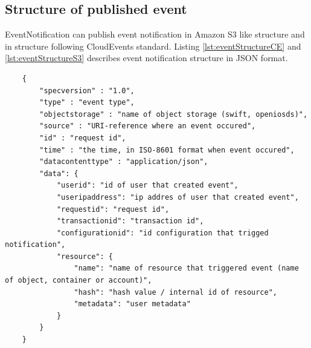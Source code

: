     \subsection{Structure of published event}
    EventNotification can publish event notification in Amazon S3 like structure and in structure following CloudEvents standard. Listing \ref{lst:eventStructureCE} and \ref{lst:eventStructureS3} describes event notification structure in JSON format.


    \begin{lstlisting}
    {
        "specversion" : "1.0",
        "type" : "event type",
        "objectstorage" : "name of object storage (swift, openiosds)",
        "source" : "URI-reference where an event occured",
        "id" : "request id",
        "time" : "the time, in ISO-8601 format when event occured",
        "datacontenttype" : "application/json",
        "data": {
            "userid": "id of user that created event",
            "useripaddress": "ip addres of user that created event",
            "requestid": "request id",
            "transactionid": "transaction id",
            "configurationid": "id configuration that trigged notification",
            "resource": {
                "name": "name of resource that triggered event (name of object, container or account)",
                "hash": "hash value / internal id of resource",
                "metadata": "user metadata"
            }
        }
    }
    \end{lstlisting}


